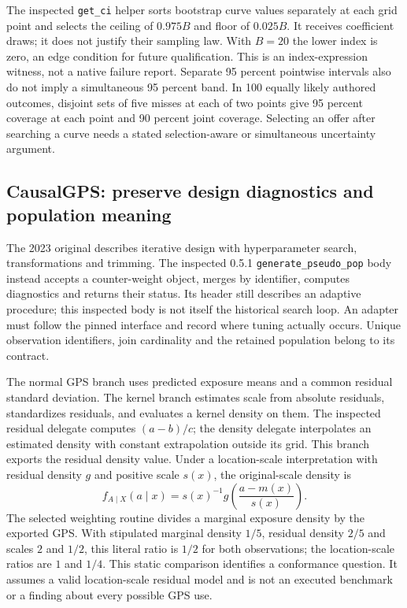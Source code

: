 The inspected \texttt{get\_ci} helper sorts bootstrap curve values separately
at each grid point and selects the ceiling of $0.975B$ and floor of $0.025B$.
It receives coefficient draws; it does not justify their sampling law. With
$B=20$ the lower index is zero, an edge condition for future qualification.
This is an index-expression witness, not a native failure report. Separate
95 percent pointwise intervals also do not imply a simultaneous 95 percent
band. In 100 equally likely authored outcomes, disjoint sets of five misses
at each of two points give 95 percent coverage at each point and 90 percent
joint coverage. Selecting an offer after searching a curve needs a stated
selection-aware or simultaneous uncertainty argument.
\citep{exec24_dose_causaldrf,exec24_dose_contract}

\subsection{CausalGPS: preserve design diagnostics and population meaning}
The 2023 original describes iterative design with hyperparameter search,
transformations and trimming. The inspected 0.5.1
\texttt{generate\_pseudo\_pop} body instead accepts a counter-weight object,
merges by identifier, computes diagnostics and returns their status. Its header
still describes an adaptive procedure; this inspected body is not itself the
historical search loop. An adapter must follow the pinned interface and record
where tuning actually occurs. Unique observation identifiers, join cardinality
and the retained population belong to its contract.
\citep{exec24_dose_causalgps,exec24_dose_original}

The normal GPS branch uses predicted exposure means and a common residual
standard deviation. The kernel branch estimates scale from absolute residuals,
standardizes residuals, and evaluates a kernel density on them. The inspected
residual delegate computes $(a-b)/c$; the density delegate interpolates an
estimated density with constant extrapolation outside its grid. This branch
exports the residual density value. Under a location-scale interpretation with
residual density $g$ and positive scale $s(x)$, the original-scale density is
\[
 f_{A\mid X}(a\mid x)=s(x)^{-1}
 g\!\left(\frac{a-m(x)}{s(x)}\right).
\]
The selected weighting routine divides a marginal exposure density by the
exported GPS. With stipulated marginal density $1/5$, residual density $2/5$
and scales $2$ and $1/2$, this literal ratio is $1/2$ for both observations;
the location-scale ratios are $1$ and $1/4$. This static comparison identifies
a conformance question. It assumes a valid location-scale residual model and
is not an executed benchmark or a finding about every possible GPS use.
\citep{exec24_dose_causalgps,exec24_dose_contract}


